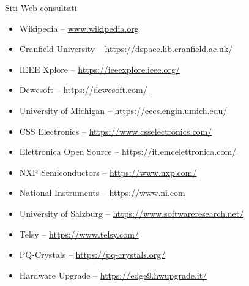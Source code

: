\cleardoublepage
{}
{}
\nocite{*}


%

\vspace{2.5cm}
\begin{Large}Siti Web consultati\end{Large}
\begin{itemize}
    \item Wikipedia -- \url{www.wikipedia.org}
    \item Cranfield University -- \url{https://dspace.lib.cranfield.ac.uk/}
    \item IEEE Xplore -- \url{https://ieeexplore.ieee.org/}
    \item Dewesoft -- \url{https://dewesoft.com/}
    \item University of Michigan -- \url{https://eecs.engin.umich.edu/}
    \item CSS Electronics -- \url{https://www.csselectronics.com/}
    \item Elettronica Open Source -- \url{https://it.emcelettronica.com/}
    \item NXP Semiconductors -- \url{https://www.nxp.com/}
    \item National Instruments -- \url{https://www.ni.com}
    \item University of Salzburg -- \url{https://www.softwareresearch.net/}
    \item Telsy -- \url{https://www.telsy.com/}
    \item PQ-Crystals -- \url{https://pq-crystals.org/}
    \item Hardware Upgrade -- \url{https://edge9.hwupgrade.it/}
\end{itemize}

